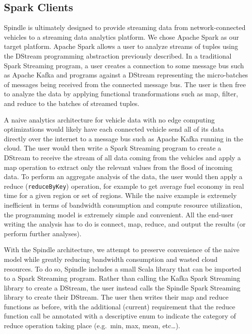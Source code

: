 \documentclass{thesis}
\begin{document}
\subsection{Spark Clients}
    Spindle is ultimately designed to provide streaming data from network-connected vehicles to a streaming data
    analytics platform. We chose Apache Spark as our target platform. Apache Spark allows a user to analyze
    streams of tuples using the DStream programming abstraction previously described. In a traditional Spark
    Streaming program, a user creates a connection to some message bus such as Apache Kafka and programs against
    a DStream representing the micro-batches of messages being received from the connected message bus. The user
    is then free to analyze the data by applying functional transformations such as map, filter, and reduce
    to the batches of streamed tuples. 
    
    A naive analytics architecture for vehicle data with no edge computing optimizations
    would likely have each connected vehicle send all of its data directly over the internet to a message bus such as
    Apache Kafka running in the cloud. The user would then write a Spark Streaming program to create a DStream
    to receive the stream of all data coming from the vehicles and apply a map operation to extract only the 
    relevant values from the flood of incoming data. To perform an aggregate analysis of the data, the user would then
    apply a reduce (\verb|reduceByKey|) operation, for example to get average fuel economy in real time for a given region or set of
    regions. While the naive example is extremely inefficient in terms of bandwidth consumption and compute resource
    utilization, the programming model is extremely simple and convenient. All the end-user writing the analysis
    has to do is connect, map, reduce, and output the results (or perform further analyses). 

    With the Spindle architecture, we attempt to preserve convenience of the naive model while greatly reducing
    bandwidth consumption and wasted cloud resources. To do so, Spindle includes a small Scala library that can be
    imported to a Spark Streaming program. Rather than calling the Kafka Spark Streaming library to create a 
    DStream, the user instead calls the Spindle Spark Streaming library to create their DStream. The user then
    writes their map and reduce functions as before, with the additional (current) requirement that the reduce function
    call be annotated with a descriptive enum to indicate the category of reduce operation taking place (e.g.\ min,
    max, mean, etc\dots).%
\end{document}
